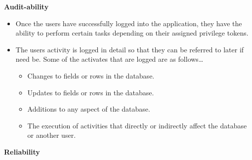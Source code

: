 \documentclass[10pt,a4paper]{article}
\begin{document}
\indent\textbf{Audit-ability}
                \begin{itemize}
                        \item  Once the users have successfully logged into the application, they have the ability to perform certain tasks depending on their assigned privilege tokens.
                        \end{itemize}
                \begin{itemize}
                        \item The users activity is logged in detail so that they can be referred to later if need be. Some of the activates that are logged are as follows…

                        \begin{itemize}
                                \item Changes to fields or rows in the database.
                        \end{itemize}
                        \begin{itemize}
                                \item Updates to fields or rows in the database.
                        \end{itemize}
                        \begin{itemize}
                                \item Additions to any aspect of the database.
                        \end{itemize}
                        \begin{itemize}
                                \item The execution of activities that directly or indirectly affect the database or another user.
                        \end{itemize}
                \end{itemize}						
                         
\indent\textbf{Reliability}         
          
\end{document}
